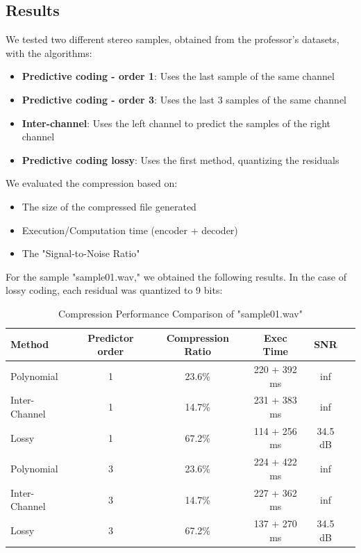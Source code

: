 \documentclass[a4paper,14pt]{article}
\begin{document}
\subsection{Results}
We tested two different stereo samples, obtained from the professor's datasets, with the algorithms:
\begin{itemize}
    \item \textbf{Predictive coding - order 1}: Uses the last sample of the same channel
    \item \textbf{Predictive coding - order 3}: Uses the last 3 samples of the same channel
    \item \textbf{Inter-channel}: Uses the left channel to predict the samples of the right channel
    \item \textbf{Predictive coding lossy}: Uses the first method, quantizing the residuals    
\end{itemize}

We evaluated the compression based on:
    \begin{itemize}
        \item The size of the compressed file generated
        \item Execution/Computation time (encoder + decoder)
        \item The "Signal-to-Noise Ratio"
    \end{itemize}


For the sample "sample01.wav," we obtained the following results. In the case of lossy coding, each residual was quantized to 9 bits:
\begin{table}[H]
\centering
\begin{tabular}{|l|c|c|c|c|c|}
\hline
\textbf{Method} & \textbf{Predictor order} & \textbf{Compression Ratio} & \textbf{Exec Time} & \textbf{SNR}\\
\hline
Polynomial & 1 & 23.6\% & 220 + 392 ms & inf\\
Inter-Channel & 1 & 14.7\% & 231 + 383 ms & inf\\
Lossy & 1 & 67.2\% & 114 + 256 ms & 34.5 dB\\
\hline
Polynomial & 3 & 23.6\% & 224 + 422 ms & inf\\ 
Inter-Channel & 3 & 14.7\% & 227 + 362 ms & inf\\
Lossy & 3 & 67.2\% & 137 + 270 ms & 34.5 dB\\
\hline
\end{tabular}
\caption{Compression Performance Comparison of "sample01.wav"}
\end{table}
\end{document}
